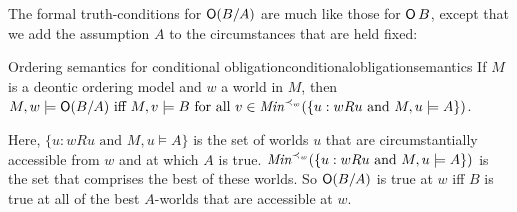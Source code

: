 



The formal truth-conditions for $\operatorname{\mathsf{O}}(B/A)$ are much like those for $\operatorname{\mathsf{O}} B$, except
that we add the assumption $A$ to the circumstances that are held fixed:

\begin{definition}{Ordering semantics for conditional obligation}{conditionalobligationsemantics}
  If $M$ is a deontic ordering model and $w$ a world in $M$, then\\[1mm]
$M,w \models \Ob (B/A) \text{ iff $M,v \models B$ for all
  $v \in \emph{Min}^{\prec_w}(\{ u: wRu \text{ and } M,u\models A \})$}$.
\end{definition}
%
\noindent%
Here, $\{ u: wRu \text{ and } M,u\models A \}$ is the set of worlds $u$ that are
circumstantially accessible from $w$ and at which $A$ is true.
$\emph{Min}^{\prec_{w}}(\{ u: wRu \text{ and } M,u\models A \})$ is the set that
comprises the best of these worlds. So $\operatorname{\mathsf{O}}(B/A)$ is true at $w$ iff $B$ is true
at all of the best $A$-worlds that are accessible at $w$.






